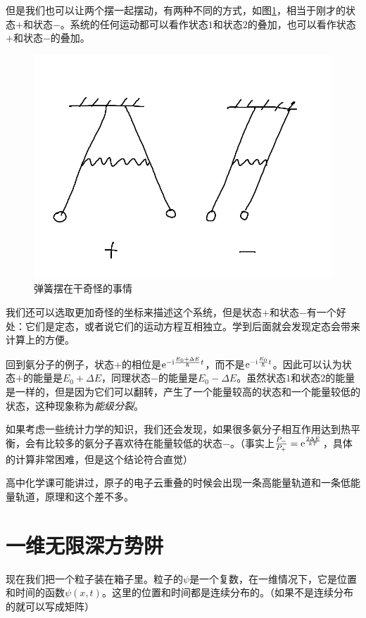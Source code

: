 但是我们也可以让两个摆一起摆动，有两种不同的方式，如图\ref{fig-spring-pend-2}，相当于刚才的状态$+$和状态$-$。系统的任何运动都可以看作状态$1$和状态$2$的叠加，也可以看作状态$+$和状态$-$的叠加。
\begin{figure}[htb]
\centering
\includegraphics[scale=0.5]{fig/spring-pend-2}
\caption{弹簧摆在干奇怪的事情}
\label{fig-spring-pend-2}
\end{figure}

我们还可以选取更加奇怪的坐标来描述这个系统，但是状态$+$和状态$-$有一个好处：它们是定态，或者说它们的运动方程互相独立。学到后面就会发现定态会带来计算上的方便。

回到氨分子的例子，状态$+$的相位是$\mathrm{e}^{-\mathrm{i} \frac{E_0+\Delta E}{\hbar} t}$，而不是$\mathrm{e}^{-\mathrm{i} \frac{E_0}{\hbar} t}$。因此可以认为状态$+$的能量是$E_0+\Delta E$，同理状态$-$的能量是$E_0-\Delta E$。虽然状态$1$和状态$2$的能量是一样的，但是因为它们可以翻转，产生了一个能量较高的状态和一个能量较低的状态，这种现象称为\emph{能级分裂}。

如果考虑一些统计力学的知识，我们还会发现，如果很多氨分子相互作用达到热平衡，会有比较多的氨分子喜欢待在能量较低的状态$-$。（事实上$\frac{P_-}{P_+}=\mathrm{e}^{\frac{2 \Delta E}{k T}}$，具体的计算非常困难，但是这个结论符合直觉）

高中化学课可能讲过，原子的电子云重叠的时候会出现一条高能量轨道和一条低能量轨道，原理和这个差不多。
\section{一维无限深方势阱}
现在我们把一个粒子装在箱子里。粒子的$\psi$是一个复数，在一维情况下，它是位置和时间的函数$\psi(x,t)$。这里的位置和时间都是连续分布的。（如果不是连续分布的就可以写成矩阵）

